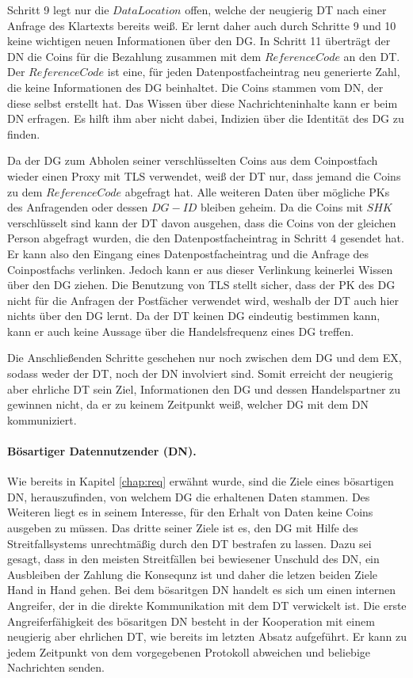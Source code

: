 \documentclass[
	fontsize=11pt,
	headings=small,
	parskip=half,           %
	bibliography=totoc,
	numbers=noenddot,       %
	open=any,               %
]{scrreprt}
\begin{document}
Schritt 9 legt nur die $DataLocation$ offen, welche der neugierig DT nach einer Anfrage des Klartexts bereits weiß. Er lernt daher auch durch Schritte 9 und 10 keine wichtigen neuen Informationen über den DG. In Schritt 11 überträgt der DN die Coins für die Bezahlung zusammen mit dem $ReferenceCode$ an den DT. Der $ReferenceCode$ ist eine, für jeden Datenpostfacheintrag neu generierte Zahl, die keine Informationen des DG beinhaltet. Die Coins stammen vom DN, der diese selbst erstellt hat. Das Wissen über diese Nachrichteninhalte kann er beim DN erfragen. Es hilft ihm aber nicht dabei, Indizien über die Identität des DG zu finden.

Da der DG zum Abholen seiner verschlüsselten Coins aus dem Coinpostfach wieder einen Proxy mit TLS verwendet, weiß der DT nur, dass jemand die Coins zu dem $ReferenceCode$ abgefragt hat. Alle weiteren Daten über mögliche PKs des Anfragenden oder dessen $DG-ID$ bleiben geheim. Da die Coins mit $SHK$ verschlüsselt sind kann der DT davon ausgehen, dass die Coins von der gleichen Person abgefragt wurden, die den Datenpostfacheintrag in Schritt 4 gesendet hat. Er kann also den Eingang eines Datenpostfacheintrag und die Anfrage des Coinpostfachs verlinken. Jedoch kann er aus dieser Verlinkung keinerlei Wissen über den DG ziehen. Die Benutzung von TLS stellt sicher, dass der PK des DG nicht für die Anfragen der Postfächer verwendet wird, weshalb der DT auch hier nichts über den DG lernt. Da der DT keinen DG eindeutig bestimmen kann, kann er auch keine Aussage über die Handelsfrequenz eines DG treffen.

Die Anschließenden Schritte geschehen nur noch zwischen dem DG und dem EX, sodass weder der DT, noch der DN involviert sind. Somit erreicht der neugierig aber ehrliche DT sein Ziel, Informationen den DG und dessen Handelspartner zu gewinnen nicht, da er zu keinem Zeitpunkt weiß, welcher DG mit dem DN kommuniziert.

\paragraph{Bösartiger Datennutzender (DN).}
Wie bereits in Kapitel \ref{chap:req} erwähnt wurde, sind die Ziele eines bösartigen DN, herauszufinden, von welchem DG die erhaltenen Daten stammen. Des Weiteren liegt es in seinem Interesse, für den Erhalt von Daten keine Coins ausgeben zu müssen. Das dritte seiner Ziele ist es, den DG mit Hilfe des Streitfallsystems unrechtmäßig durch den DT bestrafen zu lassen. Dazu sei gesagt, dass in den meisten Streitfällen bei bewiesener Unschuld des DN, ein Ausbleiben der Zahlung die Konsequnz ist und daher die letzen beiden Ziele Hand in Hand gehen. Bei dem bösaritgen DN handelt es sich um einen internen Angreifer, der in die direkte Kommunikation mit dem DT verwickelt ist. Die erste Angreiferfähigkeit des bösaritgen DN besteht in der Kooperation mit einem neugierig aber ehrlichen DT, wie bereits im letzten Absatz aufgeführt. Er kann zu jedem Zeitpunkt von dem vorgegebenen Protokoll abweichen und beliebige Nachrichten senden.
\end{document}
